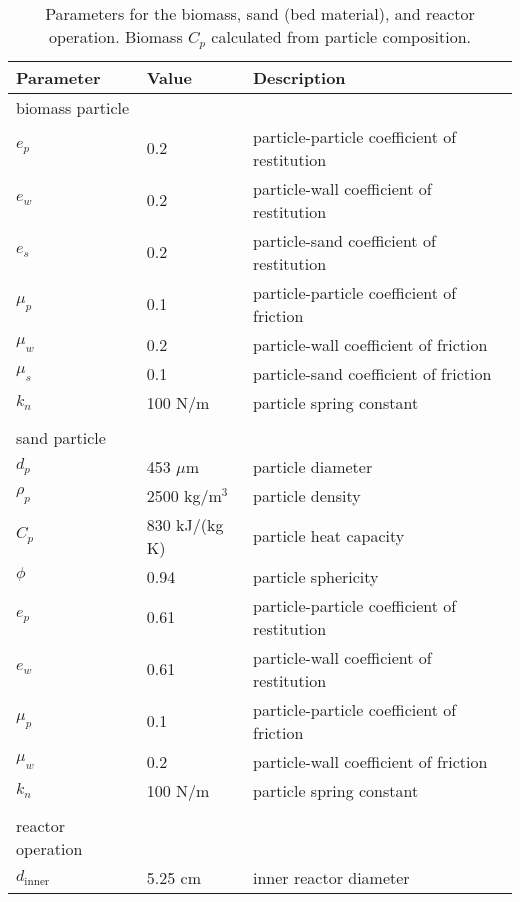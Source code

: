 \begin{table}[H]
    \centering
    \caption{Parameters for the biomass, sand (bed material), and reactor operation. Biomass $C_p$ calculated from particle composition.}
    \label{tab:params}
    \begin{tabular}{lll}
        \toprule
        Parameter & Value & Description \\
        \midrule
        biomass particle \\
        $e_{p}$    & 0.2        & particle-particle coefficient of restitution \\
        $e_{w}$    & 0.2        & particle-wall coefficient of restitution \\
        $e_{s}$    & 0.2        & particle-sand coefficient of restitution \\
        $\mu_{p}$  & 0.1        & particle-particle coefficient of friction \\
        $\mu_{w}$  & 0.2        & particle-wall coefficient of friction \\
        $\mu_{s}$  & 0.1        & particle-sand coefficient of friction \\
        $k_{n}$    & 100 N/m    & particle spring constant \\
        \\
        sand particle \\
        $d_{p}$       & 453 $\mu$m          & particle diameter \\
        $\rho_{p}$    & 2500 kg/m$^3$       & particle density \\
        $C_{p}$       & 830 kJ/(kg\,K)      & particle heat capacity \\
        $\phi_{}$     & 0.94                & particle sphericity \\
        $e_{p}$       & 0.61                & particle-particle coefficient of restitution \\
        $e_{w}$       & 0.61                & particle-wall coefficient of restitution \\
        $\mu_{p}$     & 0.1                 & particle-particle coefficient of friction \\
        $\mu_{w}$     & 0.2                 & particle-wall coefficient of friction \\
        $k_{n}$       & 100 N/m             & particle spring constant \\
        \\
        reactor operation \\
        $d_\textrm{inner}$      & 5.25 cm       & inner reactor diameter \\

\end{tabular}
\end{table}
